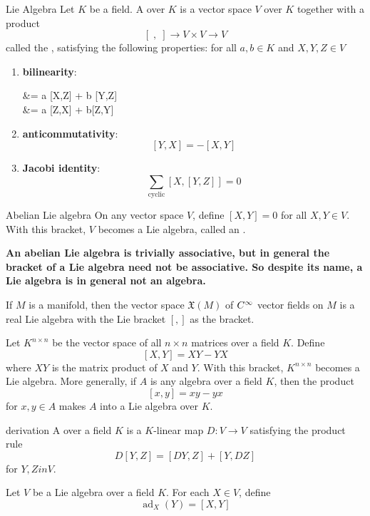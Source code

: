 \begin{definition}{Lie Algebra}{}
    Let \(K\) be a field. 
    A  over \(K\) is a vector space \(V\) over \(K\) together with a product
    \[
        [\;, \;]  \rightarrow V \times V \rightarrow V
    \]
    called the , satisfying the following properties: for all \(a,b \in K\) and \(X,Y,Z \in V\)
    \begin{enumerate}
        \item \textbf{bilinearity}: \begin{splitenv}
            [aX + bY, Z] &= a [X,Z] + b [Y,Z] \\ 
            [Z, aX + bY] &= a [Z,X] + b[Z,Y]
        \end{splitenv}
        \item \textbf{anticommutativity}: \[[Y,X] = -[X,Y]\]
        \item \textbf{Jacobi identity}: \[\sum_{\text{cyclic}} \left[ X, [Y,Z] \right] = 0\]
    \end{enumerate}
\end{definition}

\begin{example}{Abelian Lie algebra}{}
    On any vector space \(V\), define \([X,Y]=0\) for all \(X,Y \in V\). With this bracket, \(V\) becomes a Lie algebra, called an .
\end{example}
\textbf{An abelian Lie algebra is trivially associative, but in general the bracket of a
Lie algebra need not be associative. So despite its name, a Lie algebra is in general
not an algebra.}

\begin{example}{}{}
    If \(M\) is a manifold, then the vector space \(\mathfrak{X}(M)\) of \(C^\infty\) vector fields on \(M\) is a real Lie algebra with the Lie bracket \([,]\) as the bracket.
\end{example}

\begin{example}{}{}
    Let \(K^{n \times n}\) be the vector space of all \(n \times n\) matrices over a field \(K\).
    Define
    \[
        [X,Y] = XY - YX    
    \]
    where \(XY\) is the matrix product of \(X\) and \(Y\).
    With this bracket, \(K^{n \times n}\) becomes a Lie algebra.
    More generally, if \(A\) is any algebra over a field \(K\), then the product 
    \[
        [x,y] = xy - yx    
    \]
    for \(x,y \in A\) makes \(A\) into a Lie algebra over \(K\).
\end{example}
\begin{definition}{derivation}{}
    A  over a field \(K\) is a \(K\)-linear map \(D \colon V \rightarrow V\) satisfying the product rule 
    \[
        D[Y,Z] = [DY, Z] + [Y, DZ]
    \]
    for \(Y,Z in V\).
\end{definition}
\begin{example}{}{}
    Let \(V\) be a Lie algebra over a field \(K\). For each \(X \in V\), define 
    \[
        \operatorname{ad}_X (Y) = [X,Y]    
    \]
\end{example}

